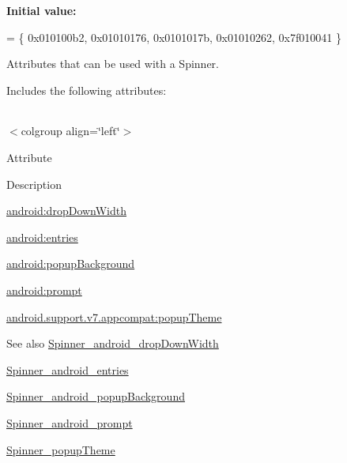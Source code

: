 {\bfseries Initial value\+:}
\begin{DoxyCode}
= \{
            0x010100b2, 0x01010176, 0x0101017b, 0x01010262,
            0x7f010041
        \}
\end{DoxyCode}
Attributes that can be used with a Spinner. 

Includes the following attributes\+:

\tabulinesep=1mm
\begin{longtabu} spread 0pt [c]{*{0}{|X[-1]}|}
\hline
\end{longtabu}
$<$colgroup align=\char`\"{}left\char`\"{}$>$ 

Attribute

Description 

{\ttfamily \hyperlink{classandroid_1_1support_1_1v7_1_1appcompat_1_1R_1_1styleable_a59418e3a2059e81ba6e01aaa6d3e8abd}{android\+:drop\+Down\+Width}}

{\ttfamily \hyperlink{classandroid_1_1support_1_1v7_1_1appcompat_1_1R_1_1styleable_a7d15e5e4370ddab8e292c37d54f20e02}{android\+:entries}}

{\ttfamily \hyperlink{classandroid_1_1support_1_1v7_1_1appcompat_1_1R_1_1styleable_a38691d098e8e7107eb730f59c1401cfc}{android\+:popup\+Background}}

{\ttfamily \hyperlink{classandroid_1_1support_1_1v7_1_1appcompat_1_1R_1_1styleable_ab4f59c7bdece7629eb5ff24a1cb7e934}{android\+:prompt}}

{\ttfamily \hyperlink{classandroid_1_1support_1_1v7_1_1appcompat_1_1R_1_1styleable_abc081afdc0bd846ad86fc722e41e48db}{android.\+support.\+v7.\+appcompat\+:popup\+Theme}}

\begin{DoxySeeAlso}{See also}
\hyperlink{classandroid_1_1support_1_1v7_1_1appcompat_1_1R_1_1styleable_a59418e3a2059e81ba6e01aaa6d3e8abd}{Spinner\+\_\+android\+\_\+drop\+Down\+Width} 

\hyperlink{classandroid_1_1support_1_1v7_1_1appcompat_1_1R_1_1styleable_a7d15e5e4370ddab8e292c37d54f20e02}{Spinner\+\_\+android\+\_\+entries} 

\hyperlink{classandroid_1_1support_1_1v7_1_1appcompat_1_1R_1_1styleable_a38691d098e8e7107eb730f59c1401cfc}{Spinner\+\_\+android\+\_\+popup\+Background} 

\hyperlink{classandroid_1_1support_1_1v7_1_1appcompat_1_1R_1_1styleable_ab4f59c7bdece7629eb5ff24a1cb7e934}{Spinner\+\_\+android\+\_\+prompt} 

\hyperlink{classandroid_1_1support_1_1v7_1_1appcompat_1_1R_1_1styleable_abc081afdc0bd846ad86fc722e41e48db}{Spinner\+\_\+popup\+Theme} 
\end{DoxySeeAlso}
\mbox{\label{classandroid_1_1support_1_1v7_1_1appcompat_1_1R_1_1styleable_a59418e3a2059e81ba6e01aaa6d3e8abd}} 
